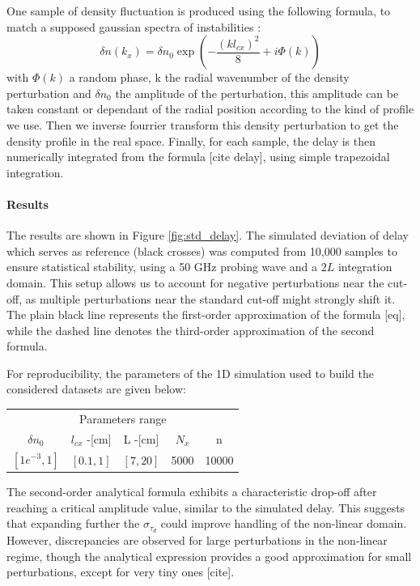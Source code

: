 \documentclass[11pt,openany]{report}
\begin{document}
\begin{multicols}{2}
    One sample of density fluctuation is produced using the following formula, to match a supposed gaussian spectra of instabilities :
    $$\delta n(k_x) = \delta n_0 \exp\left(-\frac{(kl_{cx})^2}{8} + i\Phi(k)\right)$$
    with $\Phi(k)$ a random phase, k the radial wavenumber of the density perturbation and $\delta n_0$ the amplitude of the perturbation, this amplitude can be taken constant or dependant of the radial position according to the kind of profile we use. Then we inverse fourrier transform this density perturbation to get the density profile in the real space. Finally, for each sample, the delay is then numerically integrated from the formula [cite delay], using simple trapezoidal integration.
    \paragraph*{Results}
    The results are shown in Figure \ref{fig:std_delay}. The simulated deviation of delay which serves as reference (black crosses) was computed from 10,000 samples to ensure statistical stability, using a 50 GHz probing wave and a $2L$ integration domain. This setup allows us to account for negative perturbations near the cut-off, as multiple perturbations near the standard cut-off might strongly shift it. The plain black line represents the first-order approximation of the formula [eq], while the dashed line denotes the third-order approximation of the second formula.

    For reproducibility, the parameters of the 1D simulation used to build the considered datasets are given below:
    \setlength{\tabcolsep}{.038\linewidth}
    \renewcommand{\arraystretch}{1.5}
    \begin{center}
        \begin{tabular}{ccccc}
            \toprule
            \multicolumn{5}{c}{Parameters range}                       \\
            \cmidrule{1 -5}
            $\delta n_0$   & $l_{cx}$ -[cm] & L -[cm]  & $N_x$ & n     \\
            \midrule
            $[1e^{-3}, 1]$ & $[0.1,1]$      & $[7,20]$ & 5000  & 10000 \\
            \bottomrule
        \end{tabular}
    \end{center}


    The second-order analytical formula exhibits a characteristic drop-off after reaching a critical amplitude value, similar to the simulated delay. This suggests that expanding further the $\sigma_{\tau_d}$ could improve handling of the non-linear domain. However, discrepancies are observed for large perturbations in the non-linear regime, though the analytical expression provides a good approximation for small perturbations, except for very tiny ones [cite].


\end{multicols}
\end{document}
